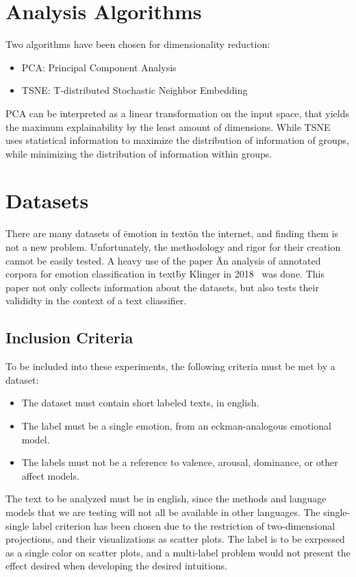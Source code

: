 \section{Analysis Algorithms}\label{sec:Analysis Algorithms}
Two algorithms have been chosen for dimensionality reduction:
\begin{itemize}
  \item PCA: Principal Component Analysis
  \item TSNE: T-distributed Stochastic Neighbor Embedding
\end{itemize}

PCA can be interpreted as a linear transformation on the input space, that yields the maximum explainability by the least amount of dimensions. While TSNE uses statistical information to maximize the distribution of information of groups, while minimizing the distribution of information within groups.

\section{Datasets}\label{sec:Datasets}
There are many datasets of \"emotion in text\" on the internet, and finding them is not a new problem. Unfortunately, the methodology and rigor for their creation cannot be easily tested. A heavy use of the paper \"An analysis of annotated corpora for emotion classification in text\" by Klinger in 2018~\cite{klinger2018analysis} was done. This paper not only collects information about the datasets, but also tests their valididty in the context of a text cliassifier.

\subsection{Inclusion Criteria}\label{sub:Inclusion Criteria}
To be included into these experiments, the following criteria must be met by a dataset:
\begin{itemize}
  \item The dataset must contain short labeled texts, in english.
  \item The label must be a single emotion, from an eckman-analogous emotional model.
  \item The labels must not be a reference to valence, arousal, dominance, or other affect models.
\end{itemize}
The text to be analyzed must be in english, since the methods and language models that we are testing will not all be available in other languages. The single-single label criterion has been chosen due to the restriction of two-dimensional projections, and their visualizations as scatter plots. The label is to be exrpessed as a single color on scatter plots, and a multi-label problem would not present the effect desired  when developing the desired intuitions.

